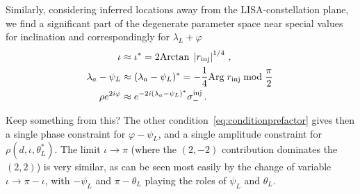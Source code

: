 \documentclass[aps,showpacs,twocolumn,prd,superscriptaddress,nofootinbib]{revtex4-1}
\newcommand{\be}{\begin{equation}}
\newcommand{\ee}{\end{equation}}
\newcommand{\bsub}{\begin{subequations}}
\newcommand{\esub}{\end{subequations}}
\newcommand\betaL{{\beta_{L}}}
\newcommand\lambdaL{{\lambda_{L}}}
\newcommand\psiL{{\psi_{L}}}
\newcommand{\jgb}[1]{{\color{DarkGreen} #1}}
\begin{document}
Similarly, considering inferred locations away from the LISA-constellation plane, we find a significant part of the degenerate parameter space near special values for inclination and correspondingly for $\lambda_L+\varphi$
\bsub
\begin{align}
	\iota&\approx\iota^{*} = 2 \mathrm{Arctan} \; \left| r_{\rm inj}\right|^{1/4} \,, \\
	\lambda_a-\psiL&\approx (\lambda_{a} - \psiL)^{*} = -\frac{1}{4} \mathrm{Arg} \; r_{\rm inj} \;\mathrm{mod}\; \frac{\pi}{2} \,\\
        \rho e^{2i\varphi} &\approx e^{-2i (\lambda_{a} - \psi_{L})^{*}} \sigma_{-}^{\rm inj} \,.
\end{align}
\esub



\jgb{Keep something from this?}
The other condition~\eqref{eq:conditionprefactor} gives then a single phase constraint for $\varphi - \psiL$, and a single amplitude constraint for $\rho(d, \iota, \theta_{L}^{*})$. The limit $\iota \rightarrow \pi$ (where the $(2,-2)$ contribution dominates the $(2,2)$) is very similar, as can be seen most easily by the change of variable $\iota \rightarrow \pi - \iota$, with $-\psiL$ and $\pi - \theta_{L}$ playing the roles of $\psiL$ and $\theta_{L}$.
\end{document}
